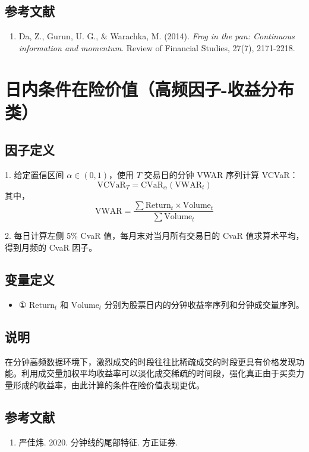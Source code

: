 \documentclass{article}
\begin{document}
\subsection{参考文献}
\begin{enumerate}
    \item Da, Z., Gurun, U. G., \& Warachka, M. (2014). \textit{Frog in the pan: Continuous information and momentum}. Review of Financial Studies, 27(7), 2171-2218.
\end{enumerate}

\section{日内条件在险价值（高频因子-收益分布类）}

\subsection{因子定义}

1. 给定置信区间 \( \alpha \in (0, 1) \)，使用 \( T \) 交易日的分钟 VWAR 序列计算 VCVaR：
\begin{equation}
    \mathrm{VCVaR}_T = \mathrm{CVaR}_\alpha (\mathrm{VWAR}_t)
\end{equation}
其中，
\begin{equation}
    \mathrm{VWAR} = \frac{\sum \mathrm{Return}_t \times \mathrm{Volume}_t}{\sum \mathrm{Volume}_t}
\end{equation}

2. 每日计算左侧 5\% CvaR 值，每月末对当月所有交易日的 CvaR 值求算术平均，得到月频的 CvaR 因子。

\subsection{变量定义}
\begin{itemize}
    \item ① \( \mathrm{Return}_t \) 和 \( \mathrm{Volume}_t \) 分别为股票日内的分钟收益率序列和分钟成交量序列。
\end{itemize}

\subsection{说明}
在分钟高频数据环境下，激烈成交的时段往往比稀疏成交的时段更具有价格发现功能。利用成交量加权平均收益率可以淡化成交稀疏的时间段，强化真正由于买卖力量形成的收益率，由此计算的条件在险价值表现更优。

\subsection{参考文献}
\begin{enumerate}
    \item 严佳炜. 2020. 分钟线的尾部特征. 方正证券.
\end{enumerate}
\end{document}
